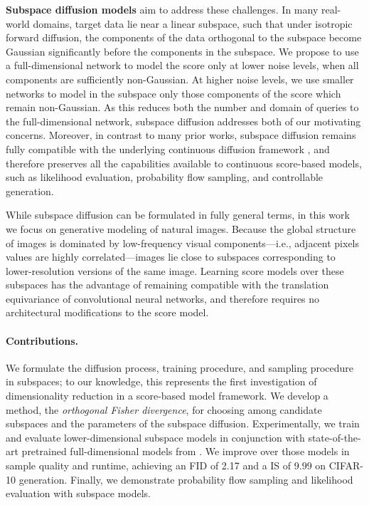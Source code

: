 \documentclass{article}
\begin{document}
\textbf{Subspace diffusion models} aim to address these challenges. In many real-world domains, target data lie near a linear subspace, such that under isotropic forward diffusion, the components of the data orthogonal to the subspace become Gaussian significantly before the components in the subspace. We propose to use a full-dimensional network to model the score only at lower noise levels, when all components are sufficiently non-Gaussian. At higher noise levels, we use smaller networks to model in the subspace only those components of the score which remain non-Gaussian. As this reduces both the number and domain of queries to the full-dimensional network, subspace diffusion addresses both of our motivating concerns. Moreover, in contrast to many prior works, subspace diffusion remains fully compatible with the underlying continuous diffusion framework \cite{song2021score}, and therefore preserves all the capabilities available to continuous score-based models, such as likelihood evaluation, probability flow sampling, and controllable generation. 

While subspace diffusion can be formulated in fully general terms, in this work we focus on generative modeling of natural images. Because the global structure of images is dominated by low-frequency visual components---i.e., adjacent pixels values are highly correlated---images lie close to subspaces corresponding to lower-resolution versions of the same image. Learning score models over these subspaces has the advantage of remaining compatible with the translation equivariance of convolutional neural networks, and therefore requires no architectural modifications to the score model.

\paragraph{\textbf{Contributions.}} We formulate the diffusion process, training procedure, and sampling procedure in subspaces; to our knowledge, this represents the first investigation of dimensionality reduction in a score-based model framework. We develop a method, the \emph{orthogonal Fisher divergence}, for choosing among candidate subspaces and the parameters of the subspace diffusion. Experimentally, we train and evaluate lower-dimensional subspace models in conjunction with state-of-the-art pretrained full-dimensional models from \cite{song2021score}. We improve over those models in sample quality and runtime, achieving an FID of 2.17 and a IS of 9.99 on CIFAR-10 generation. Finally, we demonstrate probability flow sampling and likelihood evaluation with subspace models.
\end{document}
